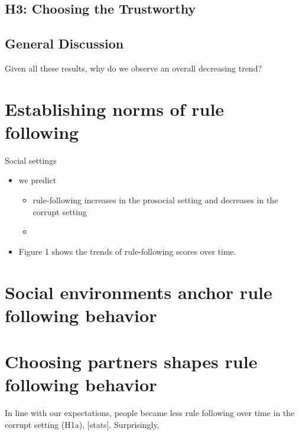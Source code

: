 \documentclass[man]{apa6}
\providecommand{\tightlist}{%
  \setlength{\itemsep}{0pt}\setlength{\parskip}{0pt}}
\begin{document}
\hypertarget{h3-choosing-the-trustworthy-1}{%
\subsection{H3: Choosing the
Trustworthy}\label{h3-choosing-the-trustworthy-1}}

\hypertarget{general-discussion}{%
\subsection{General Discussion}\label{general-discussion}}

Given all these results, why do we observe an overall decreasing trend?

\hypertarget{establishing-norms-of-rule-following}{%
\section{Establishing norms of rule
following}\label{establishing-norms-of-rule-following}}

Social settings

\begin{itemize}
\tightlist
\item
  we predict

  \begin{itemize}
  \item
    rule-following increases in the prosocial setting and decreases in
    the corrupt setting
  \item
  \end{itemize}
\item
  Figure 1 shows the trends of rule-following scores over time.
\end{itemize}

\hypertarget{social-environments-anchor-rule-following-behavior}{%
\section{Social environments anchor rule following
behavior}\label{social-environments-anchor-rule-following-behavior}}

\hypertarget{choosing-partners-shapes-rule-following-behavior}{%
\section{Choosing partners shapes rule following
behavior}\label{choosing-partners-shapes-rule-following-behavior}}

In line with our expectations, people became less rule following over
time in the corrupt setting (H1a), {[}stats{]}. Surprisingly,
\end{document}
